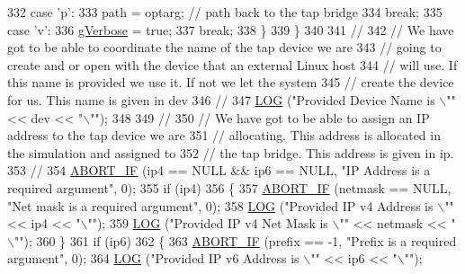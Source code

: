 \begin{DoxyCode}
332         \textcolor{keywordflow}{case} \textcolor{charliteral}{'p'}:
333           path = optarg;          \textcolor{comment}{// path back to the tap bridge}
334           \textcolor{keywordflow}{break};
335         \textcolor{keywordflow}{case} \textcolor{charliteral}{'v'}:
336           \hyperlink{tap-creator_8cc_a80b7a0563409f3e21c80e0459c85845e}{gVerbose} = \textcolor{keyword}{true};
337           \textcolor{keywordflow}{break};
338         \}
339     \}
340 
341   \textcolor{comment}{//}
342   \textcolor{comment}{// We have got to be able to coordinate the name of the tap device we are}
343   \textcolor{comment}{// going to create and or open with the device that an external Linux host}
344   \textcolor{comment}{// will use.  If this name is provided we use it.  If not we let the system}
345   \textcolor{comment}{// create the device for us.  This name is given in dev}
346   \textcolor{comment}{//}
347   \hyperlink{creator-utils_8h_a158a8c64f24645c7478298399825737f}{LOG} (\textcolor{stringliteral}{"Provided Device Name is \(\backslash\)""} << dev << \textcolor{stringliteral}{"\(\backslash\)""});
348 
349   \textcolor{comment}{//}
350   \textcolor{comment}{// We have got to be able to assign an IP address to the tap device we are}
351   \textcolor{comment}{// allocating.  This address is allocated in the simulation and assigned to}
352   \textcolor{comment}{// the tap bridge.  This address is given in ip.}
353   \textcolor{comment}{//}
354   \hyperlink{creator-utils_8h_a91c11c90ad2f1672fbd3c031038dce16}{ABORT\_IF} (ip4 == NULL && ip6 == NULL, \textcolor{stringliteral}{"IP Address is a required argument"}, 0);
355   \textcolor{keywordflow}{if} (ip4)
356     \{
357       \hyperlink{creator-utils_8h_a91c11c90ad2f1672fbd3c031038dce16}{ABORT\_IF} (netmask == NULL, \textcolor{stringliteral}{"Net mask is a required argument"}, 0);
358       \hyperlink{creator-utils_8h_a158a8c64f24645c7478298399825737f}{LOG} (\textcolor{stringliteral}{"Provided IP v4 Address is \(\backslash\)""} << ip4 << \textcolor{stringliteral}{"\(\backslash\)""});
359       \hyperlink{creator-utils_8h_a158a8c64f24645c7478298399825737f}{LOG} (\textcolor{stringliteral}{"Provided IP v4 Net Mask is \(\backslash\)""} << netmask << \textcolor{stringliteral}{"\(\backslash\)""});
360     \}
361   \textcolor{keywordflow}{if} (ip6)
362     \{
363       \hyperlink{creator-utils_8h_a91c11c90ad2f1672fbd3c031038dce16}{ABORT\_IF} (prefix == -1, \textcolor{stringliteral}{"Prefix is a required argument"}, 0);
364       \hyperlink{creator-utils_8h_a158a8c64f24645c7478298399825737f}{LOG} (\textcolor{stringliteral}{"Provided IP v6 Address is \(\backslash\)""} << ip6 << \textcolor{stringliteral}{"\(\backslash\)""});

\end{DoxyCode}
